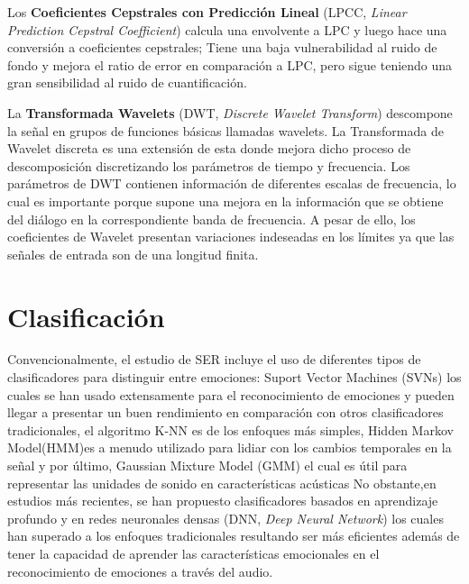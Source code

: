 \documentclass[11pt,a4paper,spanish]{book}
\begin{document}
	Los \textbf{Coeficientes Cepstrales con Predicción Lineal} (LPCC, \emph{Linear Prediction Cepstral Coefficient}) calcula una envolvente a LPC y luego hace una conversión a coeficientes cepstrales; Tiene una baja vulnerabilidad al ruido de fondo y mejora el ratio de error en comparación a LPC, pero sigue teniendo una gran sensibilidad al ruido de cuantificación.\hfill \break
	
	La \textbf{Transformada Wavelets} (DWT, \emph{Discrete Wavelet Transform}) descompone la señal en grupos de funciones básicas llamadas wavelets. La Transformada de Wavelet discreta es una extensión de esta donde mejora dicho proceso de descomposición discretizando los parámetros de tiempo y frecuencia. Los parámetros de DWT contienen información de diferentes escalas de frecuencia, lo cual es importante porque supone una mejora en la información que se obtiene del diálogo en la correspondiente banda de frecuencia. A pesar de ello, los coeficientes de Wavelet presentan variaciones indeseadas en los límites ya que las señales de entrada son de una longitud finita.\hfill \break
	
	
	
	\section{Clasificación}
	Convencionalmente, el estudio de SER incluye el uso de diferentes tipos de clasificadores para distinguir entre emociones: Suport Vector Machines (SVNs) los cuales se han usado extensamente para el reconocimiento de emociones y pueden llegar a presentar un buen rendimiento en comparación con otros clasificadores tradicionales, el algoritmo K-NN es de los enfoques más simples, Hidden Markov Model(HMM)es a menudo utilizado para lidiar con los cambios temporales en la señal y por último, Gaussian Mixture Model (GMM) el cual es útil para representar las unidades de sonido en características acústicas %
	No obstante,en estudios más recientes, se han propuesto clasificadores basados en aprendizaje profundo y en redes neuronales densas (DNN, \emph{Deep Neural Network}) los cuales han superado a los enfoques tradicionales resultando ser más eficientes además de tener la capacidad de aprender las características emocionales en el reconocimiento de emociones a través del audio.
	
\end{document}
